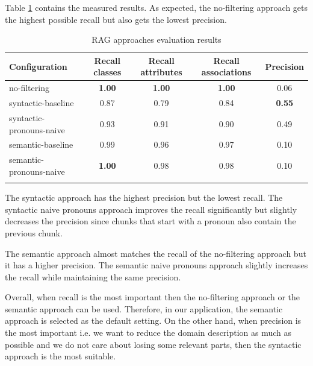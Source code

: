 Table \ref{tab:filtering-results} contains the measured results. As expected, the no-filtering approach gets the highest possible recall but also gets the lowest precision.

\begin{table}[!h]
    \scriptsize
    \centering
    \setlength{\tabcolsep}{0.5em}
    \begin{tabular}{lcccc}

    \toprule
       Configuration & Recall classes & Recall attributes & Recall associations & Precision \\
    \toprule
    
    \addlinespace
         no-filtering      & \textbf{1.00}  & \textbf{1.00}  & \textbf{1.00} & 0.06 \\
    	 syntactic-baseline & 0.87 & 0.79 & 0.84 & \textbf{0.55} \\
         syntactic-pronouns-naive & 0.93  & 0.91  & 0.90 & 0.49 \\
         semantic-baseline & 0.99 & 0.96 & 0.97 & 0.10 \\
         semantic-pronouns-naive & \textbf{1.00} & 0.98 & 0.98 & 0.10 \\
    \addlinespace
    \bottomrule
    \addlinespace
    \end{tabular}
    \caption{RAG approaches evaluation results}
    \label{tab:filtering-results}
\end{table}


The syntactic approach has the highest precision but the lowest recall. The syntactic naive pronouns approach improves the recall significantly but slightly decreases the precision since chunks that start with a pronoun also contain the previous chunk. %

The semantic approach almost matches the recall of the no-filtering approach but it has a higher precision. The semantic naive pronouns approach slightly increases the recall while maintaining the same precision.

Overall, when recall is the most important then the no-filtering approach or the semantic approach can be used. Therefore, in our application, the semantic approach is selected as the default setting. On the other hand, when precision is the most important i.e. we want to reduce the domain description as much as possible and we do not care about losing some relevant parts, then the syntactic approach is the most suitable.


